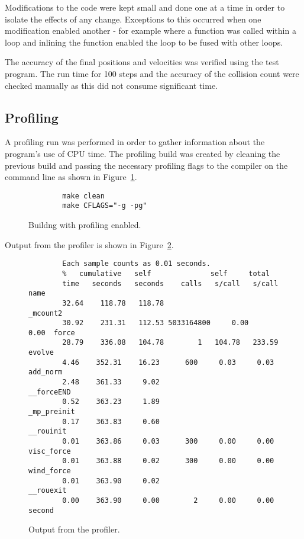 \documentclass[11pt, oneside]{article}   %
\begin{document}
Modifications to the code were kept small and done one at a time in order to isolate the effects of any change.
Exceptions to this occurred when one modification enabled another - for example where a function was called within a loop and inlining the function enabled the loop to be fused with other loops.

The accuracy of the final positions and velocities was verified using the test program.
The run time for 100 steps and the accuracy of the collision count were checked manually as this did not consume significant time.


\subsection{Profiling}

A profiling run was performed in order to gather information about the program's use of CPU time.
The profiling build was created by cleaning the previous build and passing the necessary profiling flags to the compiler on the command line as shown in Figure~\ref{fig:ProfMake}.

\begin{figure}
	\begin{lstlisting}
		make clean
		make CFLAGS="-g -pg"
	\end{lstlisting}
	\caption{Buildng with profiling enabled.}
	\label{fig:ProfMake}
\end{figure}

Output from the profiler is shown in Figure~\ref{fig:ProfOutput}.
\begin{figure}
	\begin{lstlisting}
		Each sample counts as 0.01 seconds.
		%   cumulative   self              self     total           
		time   seconds   seconds    calls   s/call   s/call  name    
		32.64    118.78   118.78                             _mcount2
		30.92    231.31   112.53 5033164800     0.00     0.00  force
		28.79    336.08   104.78        1   104.78   233.59  evolve
		4.46    352.31    16.23      600     0.03     0.03  add_norm
		2.48    361.33     9.02                             __forceEND
		0.52    363.23     1.89                             _mp_preinit
		0.17    363.83     0.60                             __rouinit
		0.01    363.86     0.03      300     0.00     0.00  visc_force
		0.01    363.88     0.02      300     0.00     0.00  wind_force
		0.01    363.90     0.02                             __rouexit
		0.00    363.90     0.00        2     0.00     0.00  second
	\end{lstlisting}
	\caption{Output from the profiler.}
	\label{fig:ProfOutput}
\end{figure}
\end{document}
